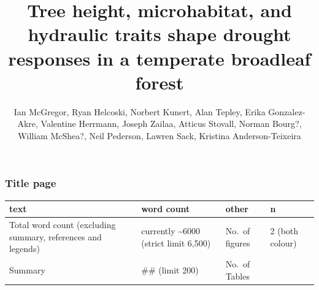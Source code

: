 \documentclass[]{article}
\title{Tree height, microhabitat, and hydraulic traits shape drought responses
in a temperate broadleaf forest}
\author{Ian McGregor, Ryan Helcoski, Norbert Kunert, Alan Tepley, Erika
Gonzalez-Akre, Valentine Herrmann, Joseph Zailaa, Atticus Stovall,
Norman Bourg?, William McShea?, Neil Pederson, Lawren Sack, Kristina
Anderson-Teixeira}
\date{}
\begin{document}
\maketitle

\raggedright

\hypertarget{title-page}{%
\subsubsection{Title page}\label{title-page}}

\begin{longtable}[]{@{}llll@{}}
\toprule
\begin{minipage}[b]{0.35\columnwidth}\raggedright
text\strut
\end{minipage} & \begin{minipage}[b]{0.16\columnwidth}\raggedright
word count\strut
\end{minipage} & \begin{minipage}[b]{0.22\columnwidth}\raggedright
other\strut
\end{minipage} & \begin{minipage}[b]{0.15\columnwidth}\raggedright
n\strut
\end{minipage}\tabularnewline
\midrule
\endhead
\begin{minipage}[t]{0.35\columnwidth}\raggedright
Total word count (excluding summary, references and legends)\strut
\end{minipage} & \begin{minipage}[t]{0.16\columnwidth}\raggedright
currently \textasciitilde{}6000 (strict limit 6,500)\strut
\end{minipage} & \begin{minipage}[t]{0.22\columnwidth}\raggedright
No.~of figures\strut
\end{minipage} & \begin{minipage}[t]{0.15\columnwidth}\raggedright
2 (both colour)\strut
\end{minipage}\tabularnewline
\begin{minipage}[t]{0.35\columnwidth}\raggedright
Summary\strut
\end{minipage} & \begin{minipage}[t]{0.16\columnwidth}\raggedright
\#\# (limit 200)\strut
\end{minipage} & \begin{minipage}[t]{0.22\columnwidth}\raggedright
No.~of Tables\strut
\end{minipage} & \begin{minipage}[t]{0.15\columnwidth}\raggedright

\end{minipage}
\end{longtable}
\end{document}
